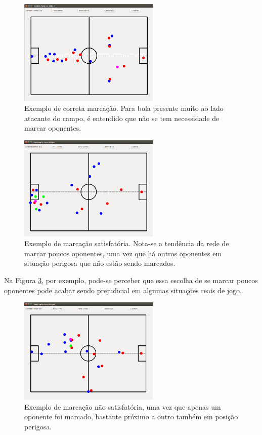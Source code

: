 \documentclass[a4paper,12pt]{article}
\begin{document}
\begin{figure}[H]
	\centering
	\includegraphics[width=0.6\textwidth]{figures/frame507.png}
   \caption{Exemplo de correta marcação. Para bola presente muito ao lado atacante do campo, é entendido que não se tem necessidade de marcar oponentes.} \label{fig:frame507}
\end{figure}

\begin{figure}[H]
	\centering
	\includegraphics[width=0.6\textwidth]{figures/frame459.png}
   \caption{Exemplo de marcação satisfatória. Nota-se a tendência da rede de marcar poucos oponentes, uma vez que há outros oponentes em situação perigosa que não estão sendo marcados.} \label{fig:frame459}
\end{figure}

Na Figura \ref{fig:frame461}, por exemplo, pode-se perceber que essa escolha de se marcar poucos oponentes pode acabar sendo prejudicial em algumas situações reais de jogo.

\begin{figure}[H]
	\centering
	\includegraphics[width=0.6\textwidth]{figures/frame461.png}
   \caption{Exemplo de marcação não satisfatória, uma vez que apenas um oponente foi marcado, bastante próximo a outro também em posição perigosa.} \label{fig:frame461}
\end{figure}
\end{document}
